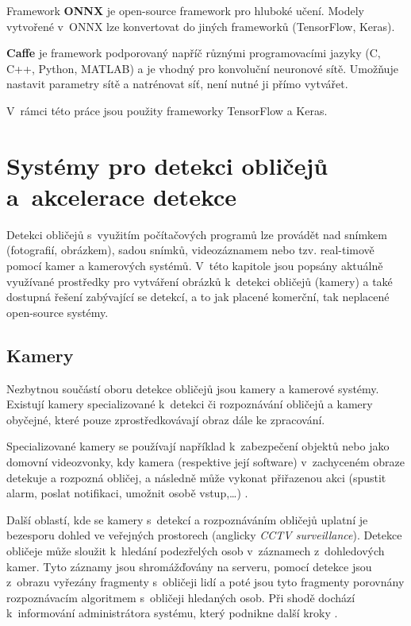 Framework \textbf{ONNX} je open-source framework pro hluboké učení. Modely vytvořené v~ONNX lze konvertovat do jiných frameworků (TensorFlow, Keras).

\textbf{Caffe} je framework podporovaný napříč různými programovacími jazyky (C, C++, Python, MATLAB) a je vhodný pro konvoluční neuronové sítě. Umožňuje nastavit parametry sítě a natrénovat síť, není nutné ji přímo vytvářet.

V~rámci této práce jsou použity frameworky TensorFlow a Keras. 


\chapter{Systémy pro detekci obličejů a~akcelerace detekce}
\label{kapitola:kamery_a_systemy}
Detekci obličejů s~využitím počítačových programů lze provádět nad snímkem 
(fotografií, obrázkem), sadou snímků,
videozáznamem nebo tzv. real-timově pomocí kamer a kamerových systémů.
V~této kapitole jsou popsány aktuálně využívané prostředky pro vytváření 
obrázků k~detekci obličejů (kamery) a také dostupná řešení zabývající se 
detekcí, a to jak placené komerční, tak neplacené open-source systémy.

\section{Kamery}
Nezbytnou součástí oboru detekce obličejů jsou kamery a kamerové systémy.
Existují kamery specializované k~detekci či rozpoznávání obličejů 
a kamery obyčejné, které pouze zprostředkovávají obraz dále ke zpracování.

Specializované kamery se používají například k~zabezpečení objektů nebo
jako domovní videozvonky, kdy kamera (respektive její software) v~zachyceném
obraze detekuje a rozpozná obličej, a následně může vykonat přiřazenou akci 
(spustit alarm, poslat notifikaci, umožnit osobě vstup,\dots) \cite{securityCamsWeb}.

Další oblastí, kde se kamery s~detekcí a rozpoznáváním obličejů uplatní je
bezesporu dohled ve veřejných prostorech (anglicky \emph{CCTV surveillance}). 
Detekce obličeje může sloužit k~hledání podezřelých osob v~záznamech z~dohledových
kamer. Tyto záznamy jsou shromážďovány na serveru, pomocí detekce jsou
z~obrazu vyřezány fragmenty s~obličeji lidí a poté jsou tyto fragmenty
porovnány rozpoznávacím algoritmem s~obličeji hledaných osob. Při shodě
dochází k~informování administrátora systému, který podnikne další kroky 
\cite{suspectIdentification}. 

